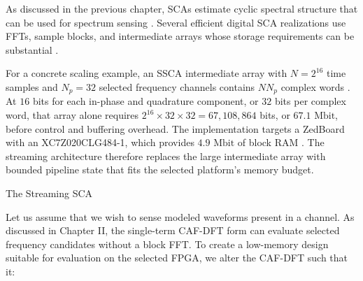 As discussed in the previous chapter, SCAs estimate cyclic spectral structure that can be used for spectrum sensing \cite{spooner-92}.  Several efficient digital SCA realizations use FFTs, sample blocks, and intermediate arrays whose storage requirements can be substantial \cite{spooner-92,liang-20}.

For a concrete scaling example, an SSCA intermediate array with $N=2^{16}$ time samples and $N_p=32$ selected frequency channels contains $NN_p$ complex words \cite{spooner-92}.  At $16$ bits for each in-phase and quadrature component, or $32$ bits per complex word, that array alone requires $2^{16}\times32\times32=67{,}108{,}864$ bits, or $67.1\text{ Mbit}$, before control and buffering overhead.  The implementation targets a ZedBoard with an XC7Z020CLG484-1, which provides $4.9\text{ Mbit}$ of block RAM \cite{xilinx-ds190}.  The streaming architecture therefore replaces the large intermediate array with bounded pipeline state that fits the selected platform's memory budget.

%
\bigskip
{}
  \quad The Streaming SCA

Let us assume that we wish to sense modeled waveforms present in a channel.  As discussed in Chapter II, the single-term CAF-DFT form can evaluate selected frequency candidates without a block FFT.  To create a low-memory design suitable for evaluation on the selected FPGA, we alter the CAF-DFT such that it:

